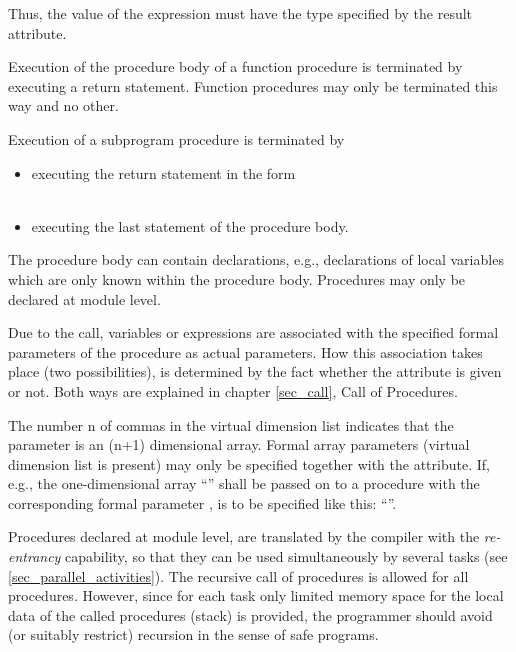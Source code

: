\begin{grammarframe}

\end{grammarframe}

Thus, the value of the expression must have the type specified by the
result attribute.

Execution of the procedure body of a function procedure is terminated by
executing a return statement. Function procedures may only be terminated
this way and no other.

Execution of a subprogram procedure is terminated by
\begin{itemize}
\item executing the return statement in the form\\
      \\
\item executing the last statement of the procedure body.
\end{itemize}

The procedure body can contain declarations, e.g., declarations of local
variables which are only known within the procedure body. 
Procedures may only be declared at module level.

Due to the call, variables or expressions are associated with the
specified formal parameters of the procedure as actual parameters. How
this association takes place (two possibilities), is determined by the
fact whether the attribute  is given or not. Both ways are
explained in chapter \ref{sec_call}, Call of Procedures.

The number n of commas in the virtual dimension list indicates that the
parameter is an (n+1) dimensional array. Formal array parameters
(virtual dimension list is present) may only be specified together with
the  attribute. If, e.g., the one-dimensional array 
``'' shall be passed on to a procedure 
 with the corresponding
formal parameter ,  is to be specified like this:
 ``''.

Procedures declared at module level, are translated by the compiler with
the {\em re-entrancy} capability, so that they can be used
simultaneously by several tasks (see \ref{sec_parallel_activities}).
 The recursive call of
procedures is allowed for all
procedures.
However, since for each task only limited memory space for the local
data of the called procedures (stack) is provided, the programmer
should avoid (or suitably restrict) recursion in the sense of safe
programs.

